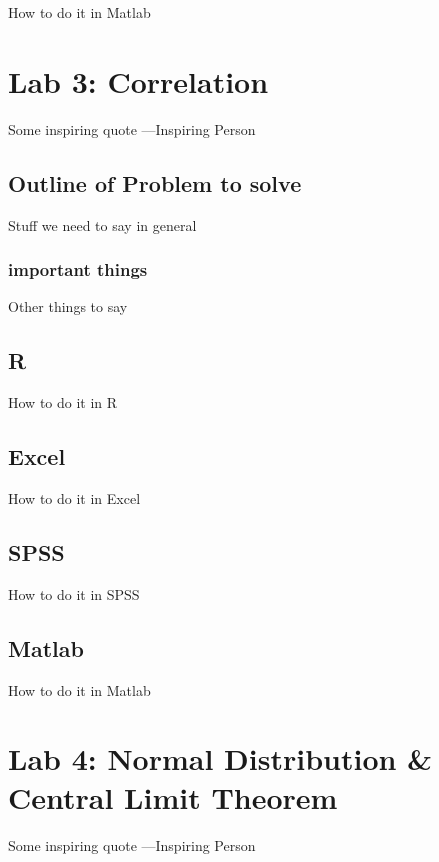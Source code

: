 \documentclass[]{book}
\theoremstyle{definition}
\theoremstyle{definition}
\theoremstyle{definition}
\theoremstyle{remark}
\begin{document}
How to do it in Matlab

\chapter{Lab 3: Correlation}\label{lab-3-correlation}

{ Some inspiring quote ---Inspiring Person }

\section{Outline of Problem to
solve}\label{outline-of-problem-to-solve-1}

Stuff we need to say in general

\subsection{important things}\label{important-things-1}

Other things to say

\section{R}\label{r-3}

How to do it in R

\section{Excel}\label{excel-2}

How to do it in Excel

\section{SPSS}\label{spss-2}

How to do it in SPSS

\section{Matlab}\label{matlab-2}

How to do it in Matlab

\chapter{Lab 4: Normal Distribution \& Central Limit
Theorem}\label{lab-4-normal-distribution-central-limit-theorem}

{ Some inspiring quote ---Inspiring Person }
\end{document}
